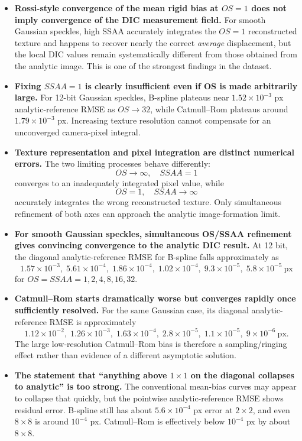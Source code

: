 \documentclass[11pt,a4paper]{article}
\begin{document}
\begin{itemize}
\item \textbf{Rossi-style convergence of the mean rigid bias at $OS=1$ does not imply convergence of the DIC measurement field.}
For smooth Gaussian speckles, high SSAA accurately integrates the $OS=1$ reconstructed texture and happens to recover nearly the correct \emph{average} displacement, but the local DIC values remain systematically different from those obtained from the analytic image. This is one of the strongest findings in the dataset.

\item \textbf{Fixing $SSAA=1$ is clearly insufficient even if OS is made arbitrarily large.}
For 12-bit Gaussian speckles, B-spline plateaus near $1.52\times10^{-3}$ px analytic-reference RMSE as $OS\rightarrow32$, while Catmull--Rom plateaus around $1.79\times10^{-3}$ px. Increasing texture resolution cannot compensate for an unconverged camera-pixel integral.

\item \textbf{Texture representation and pixel integration are distinct numerical errors.}
The two limiting processes behave differently:
\[
OS\rightarrow\infty,\quad SSAA=1
\]
converges to an inadequately integrated pixel value, while
\[
OS=1,\quad SSAA\rightarrow\infty
\]
accurately integrates the wrong reconstructed texture. Only simultaneous refinement of both axes can approach the analytic image-formation limit.

\item \textbf{For smooth Gaussian speckles, simultaneous OS/SSAA refinement gives convincing convergence to the analytic DIC result.}
At 12 bit, the diagonal analytic-reference RMSE for B-spline falls approximately as
\[
1.57\times10^{-3},\;
5.61\times10^{-4},\;
1.86\times10^{-4},\;
1.02\times10^{-4},\;
9.3\times10^{-5},\;
5.8\times10^{-5}\ \mathrm{px}
\]
for $OS=SSAA=1,2,4,8,16,32$.

\item \textbf{Catmull--Rom starts dramatically worse but converges rapidly once sufficiently resolved.}
For the same Gaussian case, its diagonal analytic-reference RMSE is approximately
\[
1.12\times10^{-2},\;
1.26\times10^{-3},\;
1.63\times10^{-4},\;
2.8\times10^{-5},\;
1.1\times10^{-5},\;
9\times10^{-6}\ \mathrm{px}.
\]
The large low-resolution Catmull--Rom bias is therefore a sampling/ringing effect rather than evidence of a different asymptotic solution.

\item \textbf{The statement that ``anything above $1\times1$ on the diagonal collapses to analytic'' is too strong.}
The conventional mean-bias curves may appear to collapse that quickly, but the pointwise analytic-reference RMSE shows residual error. B-spline still has about $5.6\times10^{-4}$ px error at $2\times2$, and even $8\times8$ is around $10^{-4}$ px. Catmull--Rom is effectively below $10^{-4}$ px by about $8\times8$.


\end{itemize}
\end{document}
